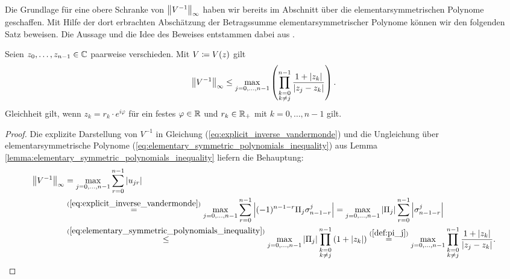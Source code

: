 Die Grundlage für eine obere Schranke von $\left\lVert V^{-1} \right\rVert_\infty$
haben wir bereits im Abschnitt über die elementarsymmetrischen Polynome geschaffen.
Mit Hilfe der dort erbrachten Abschätzung der Betragssumme
elementarsymmetrischer Polynome können wir den folgenden Satz beweisen.
Die Aussage und die Idee des Beweises entstammen dabei aus
\cite[S. 196-197]{gautschi1}.
\begin{theorem}
  \label{thm:inverse_vandermonde_upper_bound}
  Seien $z_0, \dots, z_{n-1} \in \mathbb{C}$ paarweise verschieden.
  Mit $V \coloneqq V \! \left( z \right)$ gilt
  \begin{equation}
    \label{eq:inverse_vandermonde_upper_bound}
    \left\lVert V^{-1} \right\rVert_{\infty}
    \leq \max_{j = 0, \dots, n-1} \left( \prod_{\substack{k = 0\\ k \neq j}}^{n-1} \frac{1 + \left\lvert z_k \right\rvert}{\left\lvert z_j - z_k \right\rvert} \right).
  \end{equation}
  Gleichheit gilt, wenn $z_k = r_k \cdot e^{i \varphi}$
  für ein festes $\varphi \in \mathbb{R}$ und $r_k \in \mathbb{R}_{+}$ mit $k = 0, \dots, n-1$ gilt.
\end{theorem}
\begin{proof}
    Die explizite Darstellung von $V^{-1}$ in Gleichung
    (\ref{eq:explicit_inverse_vandermonde}) und die Ungleichung
    über elementarsymmetrische Polynome
    (\ref{eq:elementary_symmetric_polynomials_inequality})
    aus Lemma \ref{lemma:elementary_symmetric_polynomials_inequality}
    liefern die Behauptung:
    \begin{equation*}
        \begin{split}
            \left\lVert V^{-1} \right\rVert_{\infty}
            &= \max_{j=0, \dots, n-1} \sum_{r=0}^{n-1} \left\lvert u_{jr} \right\rvert\\
            &\overset{(\ref{eq:explicit_inverse_vandermonde})}{=}
              \max_{j=0, \dots, n-1} \sum_{r=0}^{n-1} \left\lvert (-1)^{n-1-r} \Pi_j \sigma_{n-1-r}^{j} \right\rvert
            = \max_{j=0, \dots, n-1} \left\lvert \Pi_j \right\rvert \sum_{r=0}^{n-1} \left\lvert \sigma_{n-1-r}^{j} \right\rvert\\
            &\overset{(\ref{eq:elementary_symmetric_polynomials_inequality})}{\leq}
              \max_{j=0, \dots, n-1} \left\lvert \Pi_j \right\rvert \prod_{\substack{k=0\\ k \neq j}}^{n-1} \left( 1 + \left\lvert z_k \right\rvert \right)
            \overset{(\ref{def:pi_j})}{=}
              \max_{j=0, \dots, n-1} \prod_{\substack{k=0\\ k \neq j}}^{n-1} \frac{1 + \left\lvert z_k \right\rvert}{\left\lvert z_j - z_k \right\rvert}.
        \end{split}
    \end{equation*}
\end{proof}

